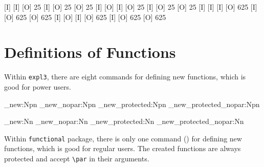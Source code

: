 \documentclass[oneside]{book}
\begin{document}
\begin{codehigh}[]
[I] 
        [I] 
                [I] 
                [O] 25
            [I] 
            [O] 25
        [O] 25
    [I] 
    [O]
        [I] \expValue{\lTmpaInt }
        [O] 25
    [I] 
    [O] 25
[O] 25
[I] 
        [I] 
                [I] 
                [O] 625
            [I] 
            [O] 625
        [O] 625
    [I] 
    [O]
        [I] \expValue{\lTmpaInt }
        [O] 625
    [I] 
    [O] 625
[O] 625
\end{codehigh}

\section{Definitions of Functions}

Within \verb!expl3!, there are eight commands for defining new functions,
which is good for power users.

\begin{minipage}{0.5\textwidth}
\begin{code}[language=latex/latex3]
\cs_new:Npn
\cs_new_nopar:Npn
\cs_new_protected:Npn
\cs_new_protected_nopar:Npn
\end{code}
\end{minipage}%
\begin{minipage}{0.5\textwidth}
\begin{code}[language=latex/latex3]
\cs_new:Nn
\cs_new_nopar:Nn
\cs_new_protected:Nn
\cs_new_protected_nopar:Nn
\end{code}
\end{minipage}

Within \verb!functional! package, there is only one command ()
for defining new functions, which is good for regular users.
The created functions are always protected and accept \verb!\par! in their arguments.
\end{document}
